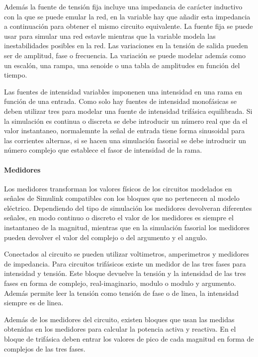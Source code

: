 \documentclass{book}
\begin{document}
Adem\'as la fuente de tensi\'on fija incluye una impedancia de car\'acter inductivo con la que se puede emular la red, en la variable hay que añadir esta impedancia a continuaci\'on para obtener el mismo circuito equivalente. La fuente fija se puede usar para simular una red estavle mientras que la variable modela las inestabilidades posibles en la red. Las variaciones en la tensi\'on de salida pueden ser de amplitud, fase o frecuencia. La variaci\'on se puede modelar adem\'as como un escal\'on, una rampa, una senoide o una tabla de amplitudes en funci\'on del tiempo. \par

Las fuentes de intensidad variables imponenen una intensidad en una rama en funci\'on de una entrada. Como solo hay fuentes de intensidad monof\'asicas se deben utilizar tres para modelar una fuente de intensidad trif\'asica equilibrada. Si la simulaci\'on es continua o discreta se debe introducir un n\'umero real que da el valor instantaneo, normalemnte la señal de entrada tiene forma sinusoidal para las corrientes alternas, si se hacen una simulaci\'on fasorial se debe introducir un n\'umero complejo que establece el fasor de intensidad de la rama. \par

		\paragraph {Medidores}
Los medidores transforman los valores f\'isicos de los circuitos modelados en señales de Simulink compatibles con los bloques que no pertenecen al modelo el\'ectrico. Dependiendo del tipo de simulaci\'on los medidores devolveran diferentes señales, en modo continuo o discreto el valor de los medidores es siempre el instantaneo de la magnitud, mientras que en la simulaci\'on fasorial los medidores pueden devolver el valor del complejo o del argumento y el angulo. \par

Conectados al circuito se pueden utilizar voltimetros, amperimetros y medidores de impedancia. Para circuitos trif\'asicos existe un medidor de las tres fases para intensidad y tensi\'on. Este bloque devuelve la tensi\'on y la intensidad de las tres fases en forma de complejo, real-imaginario, modulo o modulo y argumento. Adem\'as permite leer la tensi\'on como tensi\'on de fase o de linea, la intensidad siempre es de linea. \par

Adem\'as de los medidores del circuito, existen bloques que usan las medidas obtenidas en los medidores para calcular la potencia activa y reactiva. En el bloque de trif\'asica deben entrar los valores de pico de cada magnitud en forma de complejos de las tres fases. \par
 
\end{document}
